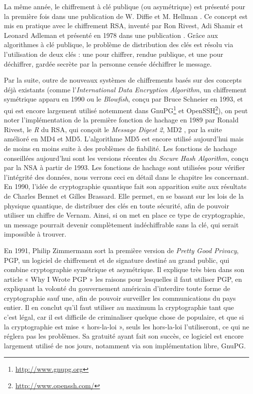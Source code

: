 La même année, le chiffrement à clé publique (ou asymétrique) est
présenté pour la première fois dans une publication de W. Diffie et
M. Hellman \cite{NewDirectionsInCryptography}. Ce concept est mis en
pratique avec le chiffrement RSA, inventé par Ron Rivest, Adi Shamir
et Leonard Adleman et présenté en 1978 dans une publication 
\cite{RSAPaper}. Grâce aux algorithmes à clé publique, le problème de
distribution des clés est résolu via l'utilisation de deux clés : une
pour chiffrer, rendue publique, et une pour déchiffrer, gardée secrète
par la personne censée déchiffrer le message.

Par la suite, outre de nouveaux systèmes de chiffrements basés sur des
concepts déjà existants (comme l'\emph{International Data Encryption
  Algorithm}, un chiffrement symétrique apparu en 1990 ou le
\emph{Blowfish}, conçu par Bruce Schneier en 1993, et qui est encore
largement utilisé notemment dans
GnuPG\footnote{\url{http://www.gnupg.org}} et
OpenSSH\footnote{\url{http://www.openssh.com/}}), on peut noter
l'implémentation de la première fonction de hachage en 1989 par Ronald
Rivest, le \emph{R} du RSA, qui conçoit le \emph{Message Digest 2},
MD2 , par la suite amélioré en MD4 et MD5. L'algorithme MD5 est encore
utilisé aujourd'hui mais de moins en moins suite à des problèmes de
fiabilité. Les fonctions de hachage conseillées aujourd'hui sont les
versions récentes du \emph{Secure Hash Algorithm}, conçu par la NSA à
partir de 1993. Les fonctions de hachage sont utilisées pour vérifier
l'intégrité des données, nous verrons ceci en détail dans le chapitre
les concernant. %
\\

En 1990, l'idée de cryptographie quantique fait son apparition suite
aux résultats de Charles Bennet et Gilles Brassard. Elle permet, en se
basant sur les lois de la physique quantique, de distribuer des clés
en toute sécurité, afin de pouvoir utiliser un chiffre de
Vernam. Ainsi, si on met en place ce type de cryptographie, un
message pourrait devenir complètement indéchiffrable sans la clé, qui
serait impossible à trouver.

En 1991, Philip Zimmermann sort la première version de \emph{Pretty Good
  Privacy}, PGP, un logiciel de chiffrement et de signature destiné au
grand public, qui combine cryptographie symétrique et asymétrique. Il
explique très bien dans son article « Why I Wrote PGP
»\cite{WhyIWrotePGP} les raisons pour lesquelles il faut utiliser PGP,
en expliquant la volonté du gouvernement américain d'interdire toute
forme de cryptographie sauf une, afin de pouvoir surveiller les
communications du pays entier. Il en conclut qu'il faut utiliser au
maximum la cryptographie tant que c'est légal, car il est difficile de
criminaliser quelque chose de populaire, et que si la cryptographie
est mise « hors-la-loi », seuls les hors-la-loi l'utiliseront, ce qui
ne réglera pas les problèmes. Sa gratuité ayant fait son succès, ce
logiciel est encore largement
utilisé de nos jours, notamment via son implémentation libre, GnuPG. \\

